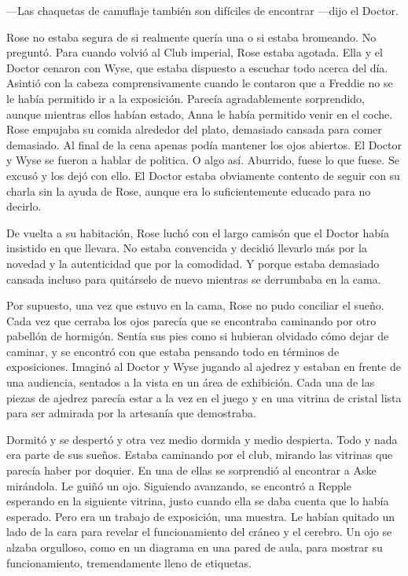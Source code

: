 {---Las chaquetas de camuflaje también son difíciles de encontrar
---dijo el Doctor.}

{Rose no estaba segura de si realmente quería una o si estaba bromeando.
	No preguntó. Para cuando volvió al Club imperial, Rose estaba agotada.
	Ella y el Doctor cenaron con Wyse, que estaba dispuesto a escuchar todo
	acerca del día. Asintió con la cabeza comprensivamente cuando le
	contaron que a Freddie no se le había permitido ir a la exposición.
	Parecía agradablemente sorprendido, aunque mientras ellos habían estado,
	Anna le había permitido venir en el coche. Rose empujaba su comida
	alrededor del plato, demasiado cansada para comer demasiado. Al final de
	la cena apenas podía mantener los ojos abiertos. El Doctor y Wyse se
	fueron a hablar de politica. O algo así. Aburrido, fuese lo que fuese.
	Se excusó y los dejó con ello. El Doctor estaba obviamente contento de
	seguir con su charla sin la ayuda de Rose, aunque era lo suficientemente
educado para no decirlo.}

{De vuelta a su habitación, Rose luchó con el largo camisón que el
	Doctor había insistido en que llevara. No estaba convencida y decidió
	llevarlo más por la novedad y la autenticidad que por la comodidad. Y
	porque estaba demasiado cansada incluso para quitárselo de nuevo
mientras se derrumbaba en la cama.}

{Por supuesto, una vez que estuvo en la cama, Rose no pudo conciliar el
	sueño. Cada vez que cerraba los ojos parecía que se encontraba caminando
	por otro pabellón de hormigón. Sentía sus pies como si hubieran olvidado
	cómo dejar de caminar, y se encontró con que estaba pensando todo en
	términos de exposiciones. Imaginó al Doctor y Wyse jugando al ajedrez y
	estaban en frente de una audiencia, sentados a la vista en un área de
	exhibición. Cada una de las piezas de ajedrez parecía estar a la vez en
	el juego y en una vitrina de cristal lista para ser admirada por la
artesanía que demostraba.}

{Dormitó y se despertó y otra vez medio dormida y medio despierta. Todo
	y nada era parte de sus sueños. Estaba caminando por el club, mirando
	las vitrinas que parecía haber por doquier. En una de ellas se
	sorprendió al encontrar a Aske mirándola. Le guiñó un ojo. Siguiendo
	avanzando, se encontró a Repple esperando en la siguiente vitrina, justo
	cuando ella se daba cuenta que lo había esperado. Pero era un trabajo de
	exposición, una muestra. Le habían quitado un lado de la cara para
	revelar el funcionamiento del cráneo y el cerebro. Un ojo se alzaba
	orgulloso, como en un diagrama en una pared de aula, para mostrar su
funcionamiento, tremendamente lleno de etiquetas.}

